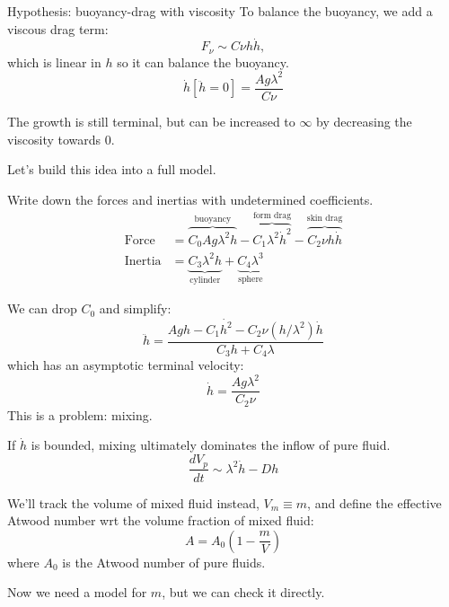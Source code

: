 \documentclass[12pt]{beamer}
\begin{document}
\begin{frame}{Hypothesis: buoyancy-drag with viscosity}
To balance the buoyancy, we add a viscous drag term:
\begin{equation*}
F_\nu \sim C \nu h \dot{h},
\end{equation*}
which is linear in $h$ so it can balance the buoyancy.
\begin{equation*}
\dot{h}\left[\ddot{h} = 0\right] = \frac{A g \lambda^2}{C \nu}
\end{equation*}
\pause

The growth is still terminal, but can be increased to $\infty$ by decreasing the viscosity towards 0.
\vspace{20pt} \pause
\begin{exampleblock}{}
Let's build this idea into a full model.
\end{exampleblock}
\end{frame}

\begin{frame}
Write down the forces and inertias with undetermined coefficients.
\begin{align*}
\text{Force} &= \overbrace{C_0 A g \lambda^2 h}^{\text{buoyancy}} - \overbrace{C_1 \lambda^2 \dot{h}^2}^{\text{form drag}} - \overbrace{C_2 \nu h \dot{h}}^{\text{skin drag}} \\
\text{Inertia} &= \underbrace{C_3 \lambda^2 h}_{\text{cylinder}} + \underbrace{C_4 \lambda^3}_{\text{sphere}}
\end{align*}\pause

We can drop $C_0$ and simplify:
\begin{equation*}
\ddot{h} = \frac{A g h - C_1 \dot{h^2} - C_2 \nu (h/\lambda^2) \dot{h}}{C_3 h + C_4 \lambda}
\end{equation*}
which has an asymptotic terminal velocity:
\begin{equation*}
\dot{h} = \frac{A g \lambda^2}{C_2 \nu}
\end{equation*}\pause
This is a problem: mixing.
\end{frame}

\begin{frame}
If $\dot{h}$ is bounded, mixing ultimately dominates the inflow of pure fluid.
\begin{equation*}
\frac{d V_p}{dt} \sim \lambda^2 \dot{h} - D h 
\end{equation*}
\pause

We'll track the volume of mixed fluid instead, $V_m \equiv m$, and define the effective Atwood number wrt the volume fraction of mixed fluid:
\begin{equation*}
A = A_0 \left(1 - \frac{m}{V}\right)
\end{equation*}
where $A_0$ is the Atwood number of pure fluids.
\vspace{20pt} \pause

Now we need a model for $m$, but we can check it directly.
\end{frame}
\end{document}
